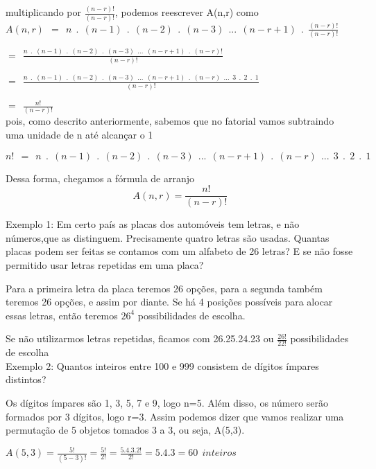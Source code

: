 \noindent
multiplicando por $\frac{(n-r)!}{(n-r)!}$, podemos reescrever A(n,r) como\\

$A(n,r)\ \ =\ \ n\ \ .\ \ (n-1)\ \ .\ \ (n-2)\ \ .\ \ (n-3)\ \ ...\ \ (n-r+1)\ \ .\ \ \frac{(n-r)!}{(n-r)!}$

\hspace{\parindent}
$=\ \ \frac{n\ \ .\ \ (n-1)\ \ .\ \ (n-2)\ \ .\ \ (n-3)\ \ ...\ \ (n-r+1)\ \ .\ \ (n-r)!}{(n-r)!}$ 

\hspace{\parindent}
$=\ \ \frac{n\ \ .\ \ (n-1)\ \ .\ \ (n-2)\ \ .\ \ (n-3)\ \ ...\ \ (n-r+1)\ \ .\ \ (n-r)\ \ ...\ \ 3\ \ . \ \ 2 \ \ . \ \ 1}{(n-r)!}$ 

\hspace{\parindent}
$=\ \ \frac{n!}{(n-r)!}$\\

\noindent
pois, como descrito anteriormente, sabemos que no fatorial vamos subtraindo uma unidade de n até alcançar o 1

\begin{center}
	$n!\ \ =\ \ n\ \ .\ \ (n-1)\ \ .\ \ (n-2)\ \ .\ \ (n-3)\ \ ...\ \ (n-r+1)\ \ .\ \ (n-r)\ \ ...\ \ 3\ \ . \ \ 2 \ \ . \ \ 1$
\end{center}

\noindent
Dessa forma, chegamos a fórmula de arranjo
\begin{equation}
A(n,r) = \frac{n!}{(n-r)!}
\end{equation}

\noindent
Exemplo 1: Em certo país as placas dos automóveis tem letras, e não números,que as distinguem. Precisamente quatro letras são usadas. Quantas placas podem ser feitas se contamos com um alfabeto de 26 letras? E se não fosse permitido usar letras repetidas em uma placa?

Para a primeira letra da placa teremos 26 opções, para a segunda também teremos 26 opções, e assim por diante. Se há 4 posições possíveis para alocar essas letras, então teremos $26^4$ possibilidades de escolha.

Se não utilizarmos letras repetidas, ficamos com 26.25.24.23 ou  $\frac{26!}{22!}$ possibilidades de escolha\\

\noindent
Exemplo 2: Quantos inteiros entre 100 e 999 consistem de dígitos ímpares distintos?

Os dígitos ímpares são 1, 3, 5, 7 e 9, logo n=5. Além disso, os número serão formados por 3 dígitos, logo r=3. Assim podemos dizer que vamos realizar uma permutação de 5 objetos tomados 3 a 3, ou seja, A(5,3).

\begin{center}
	$A(5,3) = \frac{5!}{(5-3)!}= \frac{5!}{2!}=\frac{5.4.3.2!}{2!}=5.4.3=60 \ \ inteiros$
\end{center}


